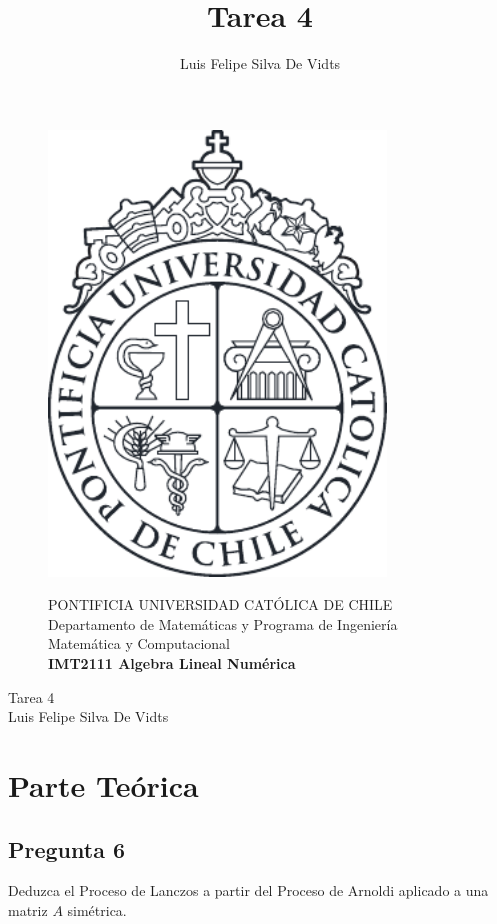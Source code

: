 \documentclass{article}
\title{Tarea 4\\}
\author{Luis Felipe Silva De Vidts}
\begin{document}
\begin{figure}
\begin{minipage}{2.5cm}
\includegraphics[width=0.8\textwidth]{./figures/LogoUC-BN}
\end{minipage}
\begin{minipage}{14.5cm}
\vspace{4mm}
{\sc PONTIFICIA UNIVERSIDAD CAT\'OLICA DE CHILE}\\
Departamento de Matemáticas y Programa de Ingeniería Matemática y Computacional \\
{\bf IMT2111 Algebra Lineal Numérica}\\
\vspace{0mm}
\hrulefill
\end{minipage}
\end{figure}
\phantom{""}
\vspace{-5mm}
\normalsize
\begin{center}
\Huge Tarea 4\\
\normalsize Luis Felipe Silva De Vidts
\end{center}
\section*{Parte Teórica}
\subsection*{Pregunta 6}
Deduzca el Proceso de Lanczos a partir del Proceso de Arnoldi aplicado a una matriz $A$ simétrica.\\
\end{document}
